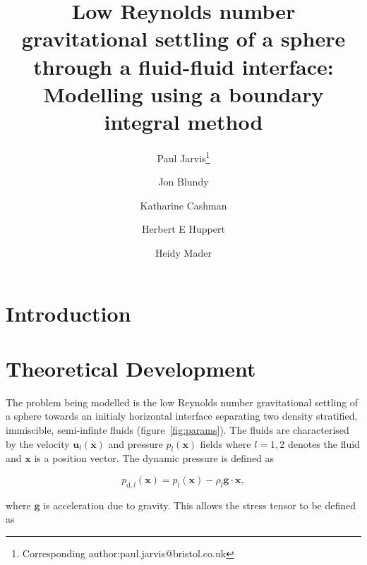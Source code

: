 \documentclass[12pt]{article}
\begin{document}
\thispagestyle{empty}

\title{Low Reynolds number gravitational settling of a sphere through a fluid-fluid interface: Modelling using a boundary integral method}

\author[1]{Paul Jarvis\footnote{Corresponding author:paul.jarvis@bristol.co.uk}}
\author[1]{Jon Blundy}
\author[1]{Katharine Cashman}
\author[1,2]{Herbert E Huppert}
\author[1]{Heidy Mader}
\date{}


\maketitle

\begin{abstract}


\end{abstract}


\section{Introduction}


\section{Theoretical Development}

The problem being modelled is the low Reynolds number gravitational settling of a sphere towards an initialy horizontal interface separating two density stratified, immiscible, semi-infinte fluids (figure~\ref{fig:params}). The fluids are characterised by the velocity $\mathbf{u}_{l}(\mathbf{x})$ and pressure $p_{l}(\mathbf{x})$ fields where $l = 1,2$ denotes the fluid and $\mathbf{x}$ is a position vector. The dynamic pressure is defined as

\begin{equation}
\label{equ:dyn_p}
p_{\text{d},l}(\mathbf{x}) = p_{l}(\mathbf{x}) - \rho_{l} \mathbf{g} \cdot \mathbf{x} ,
\end{equation}

where $\mathbf{g}$ is acceleration due to gravity. This allows the stress tensor to be defined as
\end{document}
